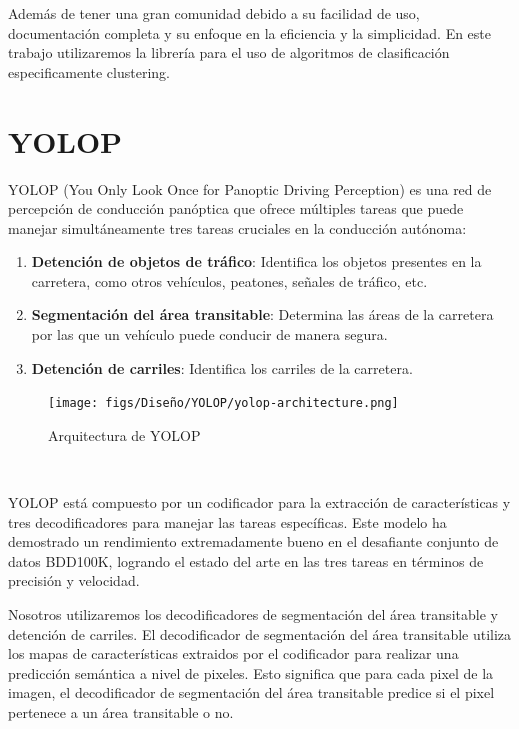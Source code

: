 Además de tener una gran comunidad debido a su facilidad de uso, documentación completa y su enfoque en la eficiencia y la simplicidad. En este trabajo utilizaremos la librería para el uso
de algoritmos de clasificación especificamente clustering. 


\section{YOLOP}
\label{sec:YOLOP}
YOLOP \cite{YOLOP} (You Only Look Once for Panoptic Driving Perception) es una red de percepción
de conducción panóptica que ofrece múltiples tareas que puede
manejar simultáneamente tres tareas cruciales en la conducción autónoma: 
\begin{enumerate}
  \item \textbf{Detención de objetos de tráfico}: Identifica los objetos presentes en la carretera, como otros vehículos, peatones, señales de tráfico, etc.
  \item \textbf{Segmentación del área transitable}: Determina las áreas de la carretera por las que un vehículo puede conducir de manera segura.
  \item \textbf{Detención de carriles}: Identifica los carriles de la carretera.
\end{enumerate}

\begin{figure} [H]
  \begin{center}
    \texttt{[image: figs/Diseño/YOLOP/yolop-architecture.png]}
  \end{center}
  \caption{Arquitectura de YOLOP}
  \label{fig:Arq_YOLOP}
\end{figure}\

YOLOP está compuesto por un codificador para la extracción de características y tres decodificadores para manejar las tareas específicas. Este modelo ha demostrado un rendimiento 
extremadamente bueno en el desafiante conjunto de datos BDD100K\cite{BDD100K}, logrando el estado del arte en las tres tareas en términos de precisión y velocidad. \newline

Nosotros utilizaremos los decodificadores de segmentación del área transitable 
y detención de carriles. El decodificador de segmentación del área transitable utiliza los mapas de características
extraidos por el codificador para realizar una predicción semántica a nivel de pixeles. Esto significa que 
para cada pixel de la imagen, el decodificador de segmentación del área transitable predice si el pixel 
pertenece a un área transitable o no. \newline

